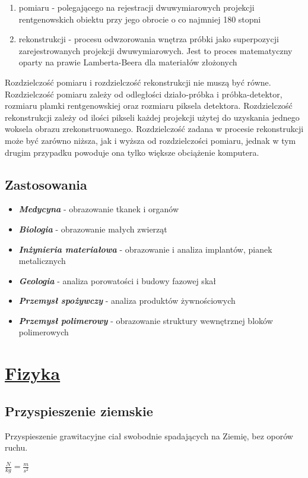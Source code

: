 \documentclass{article}
\begin{document}
\begin{enumerate}
	\item pomiaru - polegającego na rejestracji dwuwymiarowych projekcji rentgenowskich obiektu przy jego obrocie o co najmniej 180 stopni
	\item rekonstrukcji - procesu odwzorowania wnętrza próbki jako superpozycji zarejestrowanych projekcji dwuwymiarowych. Jest to proces matematyczny oparty na prawie Lamberta-Beera dla materiałów złożonych
\end{enumerate}

Rozdzielczość pomiaru i rozdzielczość rekonstrukcji nie muszą być równe. Rozdzielczość pomiaru zależy od odległości działo-próbka i próbka-detektor, rozmiaru plamki rentgenowskiej oraz rozmiaru piksela detektora. Rozdzielczość rekonstrukcji zależy od ilości pikseli każdej projekcji użytej do uzyskania jednego woksela obrazu zrekonstruowanego. Rozdzielczość zadana w procesie rekonstrukcji może być zarówno niższa, jak i wyższa od rozdzielczości pomiaru, jednak w tym drugim przypadku powoduje ona tylko większe obciążenie komputera.

\subsection{Zastosowania}

\begin{itemize}
	\item \textit{\textbf{Medycyna}} - obrazowanie tkanek i organów
	\item \textit{\textbf{Biologia}} - obrazowanie małych zwierząt
	\item \textit{\textbf{Inżynieria materiałowa}} - obrazowanie i analiza implantów, pianek metalicznych
	\item \textit{\textbf{Geologia}} - analiza porowatości i budowy fazowej skał
	\item \textit{\textbf{Przemysł spożywczy}} - analiza produktów żywnościowych
	\item \textit{\textbf{Przemysł polimerowy}} - obrazowanie struktury wewnętrznej bloków polimerowych
\end{itemize}

\newpage
\section{\underline{Fizyka}}

\subsection{Przyspieszenie ziemskie}\cite{przyspieszenie_ziemskie}
 Przyspieszenie grawitacyjne ciał swobodnie spadających na Ziemię, bez oporów ruchu. 
\begin{center}
$\frac{N}{kg}=\frac{m}{s^2}$
\end{center}
\end{document}

